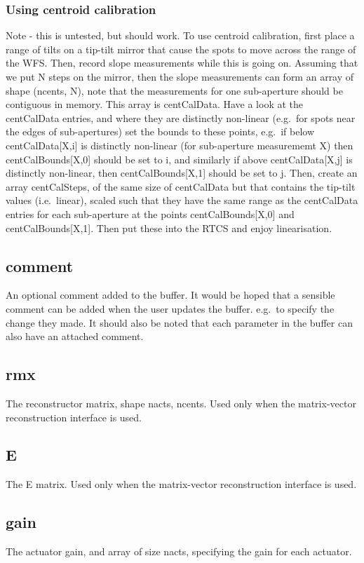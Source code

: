 \documentclass[a4,10pt]{article}
\begin{document}
\subsubsection{Using centroid calibration}
Note - this is untested, but should work.  To use centroid
calibration, first place a range of tilts on a tip-tilt mirror that
cause the spots to move across the range of the WFS.  Then, record
slope measurements while this is going on.  Assuming that we put N
steps on the mirror, then the slope measurements can form an array of
shape (ncents, N), note that the measurements for one sub-aperture
should be contiguous in memory.  This array is centCalData.  Have a
look at the centCalData entries, and where they are distinctly
non-linear (e.g.\ for spots near the edges of sub-apertures) set the
bounds to these points, e.g.\ if below centCalData[X,i] is distinctly
non-linear (for sub-aperture measurememt X) then centCalBounds[X,0]
should be set to i, and similarly if above centCalData[X,j] is
distinctly non-linear, then centCalBounds[X,1] should be set to j.
Then, create an array centCalSteps, of the same size of centCalData
but that contains the tip-tilt values (i.e.\ linear), scaled such that
they have the same range as the centCalData entries for each
sub-aperture at the points centCalBounds[X,0] and centCalBounds[X,1].
Then put these into the RTCS and enjoy linearisation.


\subsection{comment}
An optional comment added to the buffer.  It would be hoped that
a sensible comment can be added when the user updates the buffer.
e.g.\ to specify the change they made.  It should also be noted that
each parameter in the buffer can also have an attached comment.

\subsection{rmx}
The reconstructor matrix, shape nacts, ncents.  Used only when the
matrix-vector reconstruction interface is used.

\subsection{E}
The E matrix.  Used only when the
matrix-vector reconstruction interface is used.

\subsection{gain}
The actuator gain, and array of size nacts, specifying the gain for
each actuator.  
\end{document}
